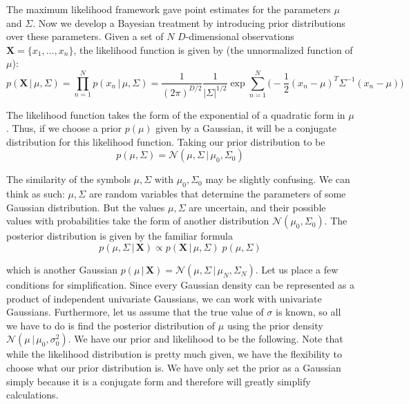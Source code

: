   The maximum likelihood framework gave point estimates for the parameters $\mu$ and $\Sigma$. Now we develop a Bayesian treatment by introducing prior distributions over these parameters. Given a set of $N$ $D$-dimensional observations $\mathbf{X} = \{x_1, \ldots, x_n\}$, the likelihood function is given by (the unnormalized function of $\mu$):
  \begin{equation}
    p(\mathbf{X}\,|\,\mu, \Sigma) = \prod_{n=1}^N p(x_n\,|\,\mu, \Sigma) = \frac{1}{(2\pi)^{D/2}} \frac{1}{|\Sigma|^{1/2}} \exp \sum_{n=1}^N \bigg(-\frac{1}{2} (x_n - \mu)^T \Sigma^{-1} (x_n - \mu)\bigg)
  \end{equation}

  The likelihood function takes the form of the exponential of a quadratic form in $\mu$. Thus, if we choose a prior $p(\mu)$ given by a Gaussian, it will be a conjugate distribution for this likelihood function. Taking our prior distribution to be
  \begin{equation}
    p(\mu, \Sigma) = \mathcal{N}(\mu, \Sigma\,|\,\mu_0, \Sigma_0)
  \end{equation}

  The similarity of the symbols $\mu, \Sigma$ with $\mu_0, \Sigma_0$ may be slightly confusing. We can think as such: $\mu, \Sigma$ are random variables that determine the parameters of some Gaussian distribution. But the values $\mu, \Sigma$ are uncertain, and their possible values with probabilities take the form of another distribution $\mathcal{N}(\mu_0, \Sigma_0)$. The posterior distribution is given by the familiar formula
  \begin{equation}
    p(\mu, \Sigma\,|\,\mathbf{X}) \propto p(\mathbf{X}\,|\,\mu, \Sigma) \; p(\mu, \Sigma)
  \end{equation}

  which is another Gaussian $p(\mu\,|\,\mathbf{X}) = \mathcal{N}(\mu, \Sigma\,|\, \mu_N, \Sigma_N)$. Let us place a few conditions for simplification. Since every Gaussian density can be represented as a product of independent univariate Gaussians, we can work with univariate Gaussians. Furthermore, let us assume that the true value of $\sigma$ is known, so all we have to do is find the posterior distribution of $\mu$ using the prior density $\mathcal{N}(\mu\,|\,\mu_0, \sigma_0^2)$. We have our prior and likelihood to be the following. Note that while the likelihood distribution is pretty much given, we have the flexibility to choose what our prior distribution is. We have only set the prior as a Gaussian simply because it is a conjugate form and therefore will greatly simplify calculations.

